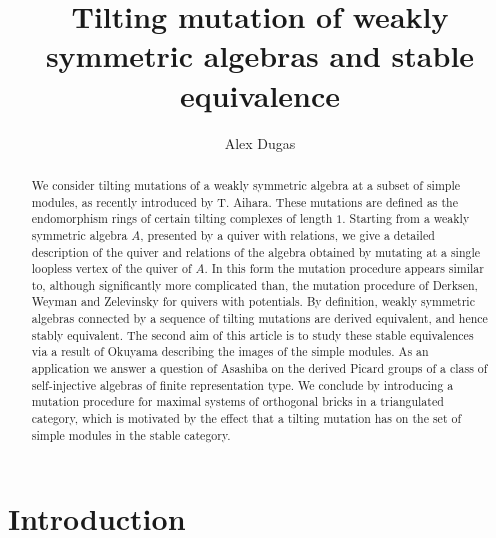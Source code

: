 \documentclass{amsart}
\begin{document}

\newtheorem{therm}{Theorem}[section]
\newtheorem{defin}[therm]{Definition}
\newtheorem{propos}[therm]{Proposition}
\newtheorem{lemma}[therm]{Lemma}
\newtheorem{coro}[therm]{Corollary}

\title{Tilting mutation of weakly symmetric algebras and stable equivalence}
\author{Alex Dugas}
\address{Department of Mathematics, University of the Pacific, 3601 Pacific Ave, Stockton CA 95211, USA}


\begin{abstract} We consider tilting mutations of a weakly symmetric algebra at a subset of simple modules, as recently introduced by T. Aihara.  These mutations are defined as the endomorphism rings of certain tilting complexes of length $1$.  Starting from a weakly symmetric algebra $A$, presented by a quiver with relations, we give a detailed description of the quiver and relations of the algebra obtained by mutating at a single loopless vertex of the quiver of $A$.  In this form the mutation procedure appears similar to, although significantly more complicated than, the mutation procedure of Derksen, Weyman and Zelevinsky for quivers with potentials.  By definition, weakly symmetric algebras connected by a sequence of tilting mutations are derived equivalent, and hence stably equivalent.  The second aim of this article is to study these stable equivalences via a result of Okuyama describing the images of the simple modules.   As an application we answer a question of Asashiba on the derived Picard groups of a class of self-injective algebras of finite representation type.  We conclude by introducing a mutation procedure for maximal systems of orthogonal bricks in a triangulated category, which is motivated by the effect that a tilting mutation has on the set of simple modules in the stable category.
  \end{abstract}

\maketitle
 
 \section{Introduction}
 
\end{document}
